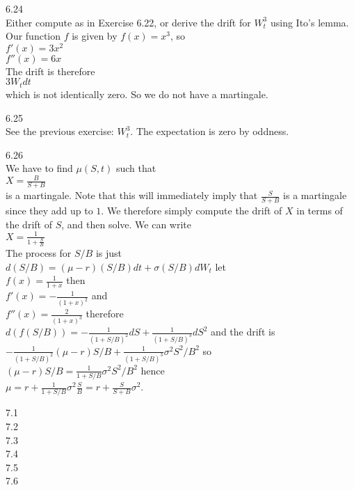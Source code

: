 6.24 \\
Either compute as in Exercise 6.22, or derive the drift for $W_t^3$ using Ito's lemma. Our function $f$ is given by $f(x)=x^3$, so \\
$f'(x)=3x^2$ \\
$f''(x)=6x$ \\
The drift is therefore \\
$3 W_t dt$ \\
which is not identically zero. So we do not have a martingale.

6.25 \\
See the previous exercise: $W_t^3$. The expectation is zero by oddness.

6.26 \\
We have to find $\mu (S,t)$ such that \\
$X = \frac{B}{S+B}$ \\
is a martingale. Note that this will immediately imply that $\frac{S}{S + B}$ is a martingale since they add up to $1$. We therefore simply compute the drift of $X$ in terms of the drift of $S$, and then solve. We can write \\
$X = \frac{1}{1+ \frac{S}{B}}$ \\
The process for $S/B$ is just \\
$d(S/B)=(\mu - r)(S/B)dt + \sigma (S/B) dW_t$ let \\
$f(x)=\frac{1}{1+x}$ then \\
$f'(x)=-\frac{1}{(1+x)^2}$ and \\
$f''(x) = \frac{2}{(1+x)^3}$ therefore \\
$d(f(S/B)) = -\frac{1}{(1+S/B)^2} dS + \frac{1}{(1+S/B)^3} dS^2$ and the drift is \\
$-\frac{1}{(1+S/B)^2}(\mu - r)S/B + \frac{1}{(1+S/B)^3} \sigma^2 S^2/B^2$ so \\
$(\mu - r)S/B = \frac{1}{1+S/B} \sigma^2 S^2/B^2$ hence \\
$\mu = r + \frac{1}{1+S/B} \sigma^2 \frac{S}{B} = r + \frac{S}{S+B} \sigma^2$.

7.1 \\


7.2 \\


7.3 \\


7.4 \\


7.5 \\


7.6 \\


